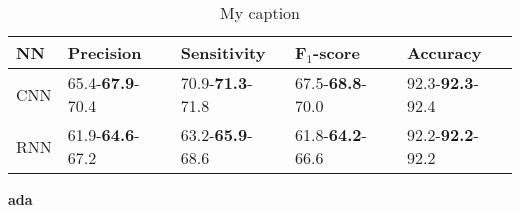 \begin{table}[th!]
\centering
\begin{tabular}{l | llll}
NN & Precision & Sensitivity & F$_1$-score & Accuracy \\\hline
CNN               & 65.4-\textbf{67.9}-70.4 & 70.9-\textbf{71.3}-71.8 & 67.5-\textbf{68.8}-70.0 & 92.3-\textbf{92.3}-92.4\\
RNN               & 61.9-\textbf{64.6}-67.2 & 63.2-\textbf{65.9}-68.6 & 61.8-\textbf{64.2}-66.6 & 92.2-\textbf{92.2}-92.2
\end{tabular}
\caption{My caption}
\label{tb_res_2}
\end{table}


\textbf{ada}